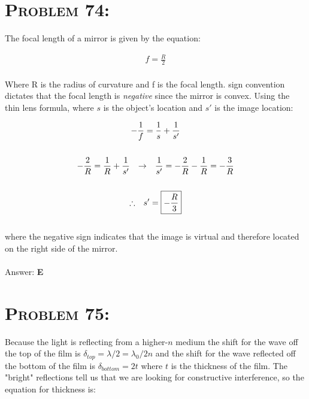 \documentclass{article}
\begin{document}

\section{\textsc{Problem 74:}}The focal length of a mirror is given by the equation:

\begin{align}
f = \frac{R}{2}
\end{align}
\\
Where R is the radius of curvature and f is the focal length. sign convention dictates that the focal length is \textit{negative} since the mirror is convex. Using the thin lens formula, where $s$ is the object's location and $s'$ is the image location:

\begin{gather}
-\frac{1}{f} = \frac{1}{s} + \frac{1}{s'} \\
\nonumber\\
-\frac{2}{R} = \frac{1}{R} + \frac{1}{s'} \hspace{.1in} \rightarrow  \hspace{.1in} \frac{1}{s'} =  -\frac{2}{R} - \frac{1}{R} = -\frac{3}{R} \nonumber\\
\nonumber\\
\therefore \hspace{.1in} s' = \boxed{-\frac{R}{3}}\nonumber
\end{gather}
\\
where the negative sign indicates that the image is virtual and therefore located on the right side of the mirror.
\\\\
Answer: \textbf{\textcolor{ProcessBlue}E}\\


\section{\textsc{Problem 75:}} Because the light is reflecting from a higher-$n$ medium the shift for the wave off the top of the film is $\delta_{top} = \lambda/2 = \lambda_{0}/2n$ and the shift for the wave reflected off the bottom of the film is $\delta_{bottom} =2t$ where $t$ is the thickness of the film. The "bright" reflections tell us that we are looking for constructive interference, so the equation for thickness is:
\end{document}
